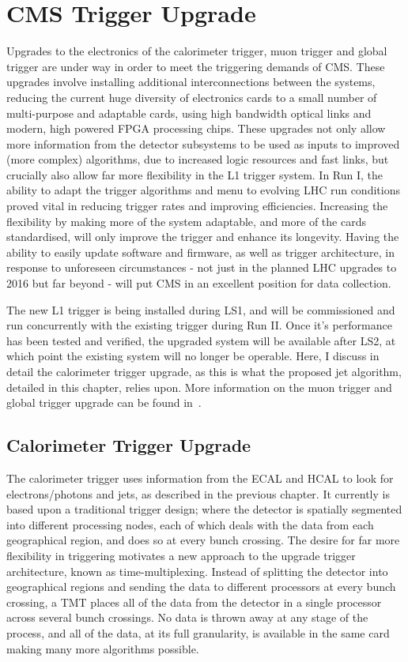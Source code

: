 \section{CMS Trigger Upgrade}
Upgrades to the electronics of the calorimeter trigger, muon trigger and global trigger are under way in order 
to meet the triggering demands of \ac{CMS}.
These upgrades involve installing additional interconnections between the systems, reducing the current huge diversity of electronics cards to a small number of multi-purpose and adaptable cards, using high bandwidth optical links and modern, high powered \ac{FPGA} processing chips. 
These upgrades not only allow more information from the detector subsystems to be used as inputs to improved (more complex) algorithms, due to increased logic resources and fast links, 
but crucially also allow far more flexibility in the \ac{L1} trigger system. 
In Run I, the ability to adapt the trigger algorithms and menu to evolving \ac{LHC} run conditions proved vital in reducing trigger rates and improving efficiencies. 
Increasing the flexibility by making more of the system adaptable, and more of the cards standardised, will only improve the trigger and enhance its longevity. 
Having the ability to easily update software and firmware, as well as trigger architecture, in response to unforeseen circumstances - not just in the planned \ac{LHC} upgrades to 2016 but far beyond - will put \ac{CMS} in an excellent position for data collection.

The new \ac{L1} trigger is being installed during LS1, and will be commissioned and run concurrently with the existing trigger during Run II. 
Once it's performance has been tested and verified, the upgraded system will be available after LS2, at which point the existing system will no longer be operable.
Here, I discuss in detail the calorimeter trigger upgrade, as this is what the proposed jet algorithm, detailed in this chapter, relies upon.
More information on the muon trigger and global trigger upgrade can be found in~\cite{Tapper:1556311}.



\subsection{Calorimeter Trigger Upgrade}
The calorimeter trigger uses information from the \ac{ECAL} and \ac{HCAL} to look for electrons/photons and jets, as described in the previous chapter.
It currently is based upon a traditional trigger design; where the detector is spatially segmented into different processing nodes, each of which deals with the data from each geographical region, and does so at every bunch crossing.
The desire for far more flexibility in triggering motivates a new approach to the upgrade trigger architecture, known as time-multiplexing.
Instead of splitting the detector into geographical regions and sending the data to different processors at every bunch crossing, 
a \ac{TMT} places all of the data from the detector in a single processor across several bunch crossings.
No data is thrown away at any stage of the process, and all of the data, at its full granularity, is available in the same card making many more algorithms possible.


